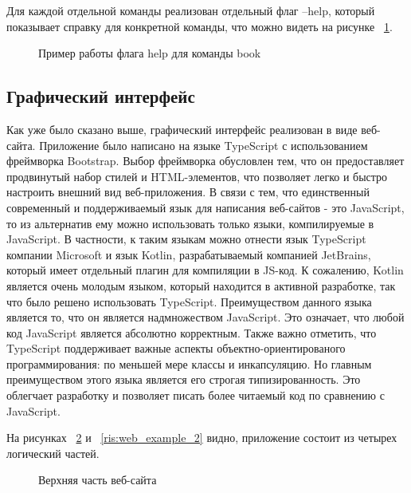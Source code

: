 Для каждой отдельной команды реализован
отдельный флаг --help, который показывает справку для конкретной команды, что можно видеть на рисунке 
~\ref{ris:help_book_example}. 

\begin{figure}[h!]
\caption{Пример работы флага help для команды book}
\label{ris:help_book_example}
\end{figure}

\subsection*{Графический интерфейс}

Как уже было сказано выше, графический интерфейс реализован в виде веб-сайта. Приложение было написано на языке TypeScript с 
использованием фреймворка Bootstrap.
Выбор фреймворка обусловлен тем, что он предоставляет продвинутый набор стилей и HTML-элементов, что позволяет 
легко и быстро настроить внешний вид веб-приложения.
В связи с тем, что единственный современный и поддерживаемый язык для написания веб-сайтов - это JavaScript, то 
из альтернатив ему можно использовать только языки, компилируемые в JavaScript. В частности, к таким языкам можно 
отнести язык TypeScript компании Microsoft и язык Kotlin, разрабатываемый компанией JetBrains, который имеет 
отдельный плагин для компиляции в JS-код. К сожалению, Kotlin является очень молодым языком, который находится в 
активной разработке, так что было решено использовать TypeScript\cite{TypeScript}. Преимуществом данного языка является то, что 
он является надмножеством JavaScript. Это означает, что любой код JavaScript является абсолютно корректным. Также 
важно отметить, что TypeScript поддерживает важные аспекты объектно-ориентированого программирования: по меньшей мере классы 
и инкапсуляцию. Но главным преимуществом этого языка является его строгая типизированность. 
Это облегчает разработку и позволяет писать более читаемый код по сравнению с JavaScript.

На рисунках ~\ref{ris:web_example_1} и ~\ref{ris:web_example_2} видно, приложение состоит из четырех логический частей. 

\begin{figure}[h!]
    \caption{Верхняя часть веб-сайта}
    \label{ris:web_example_1}
\end{figure}


